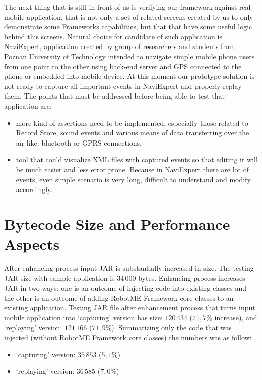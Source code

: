 The next thing that is still in front of us is verifying our framework against
real mobile application, that is not only a set of related screens created by
us to only demonstrate some Frameworks capabilities, but that that
have some useful logic behind this screens. Natural choice for candidate of such
application is NaviExpert, application created by group of researchers and
students from Poznan University of Technology intended to navigate simple
mobile phone users from one point to the other using back-end server and
GPS connected to the phone or embedded into mobile device. At this moment our prototype
solution is not ready to capture all important events in NaviExpert and
properly replay them. The points that must be addressed before being able to
test that application are:

\begin{itemize}
\item more kind of assertions need to be implemented, especially those related to 
  Record Store, sound events and various means of data transferring over the air like:
  bluetooth or GPRS connections.
\item tool that could visualize XML files with captured events so that editing
  it will be much easier and less error prone. Because in NaviExpert there
  are lot of events, even simple scenario is very long, difficult
  to understand and modify accordingly.
\end{itemize}

\section{Bytecode Size and Performance Aspects}

After enhancing process input JAR is substantially increased in size. The testing JAR size with sample application
is $34\,000$ bytes. Enhancing process increases JAR in two ways: one is an outcome of injecting code into existing classes
and the other is an outcome of adding RobotME Framework core classes to an existing application.
Testing JAR file after enhancement process that turns input mobile application into `capturing'
version has size: $120\,434$ ($71{,}7$\% increase), and `replaying' version: $121\,166$ ($71{,}9$\%).
Summarizing only the code that was injected (without RobotME Framework core classes) the numbers was as
follow:
\begin{itemize}
\item `capturing' version: $35\,853$ ($5{,}1$\%)
\item `replaying' version: $36\,585$ ($7{,}0$\%)
\end{itemize}

